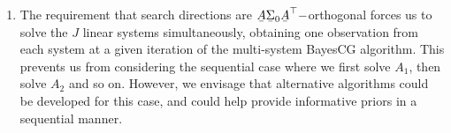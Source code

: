 \documentclass[twoside]{article}
\newcommand\barbelow[1]{\stackunder[1.2pt]{$#1$}{\rule{.8ex}{.075ex}}}
\begin{document}
\begin{enumerate}
	\item The requirement that search directions are $\barbelow{A} \barbelow{\Sigma}_0 \barbelow{A}^\top-$orthogonal forces us to solve the $J$ linear systems simultaneously, obtaining one observation from each system at a given iteration of the multi-system BayesCG algorithm. This prevents us from considering the sequential case where we first solve $A_1$, then solve $A_2$ and so on. However, we envisage that alternative algorithms could be developed for this case, and could help provide informative priors in a sequential manner.

\end{enumerate}



\end{document}

